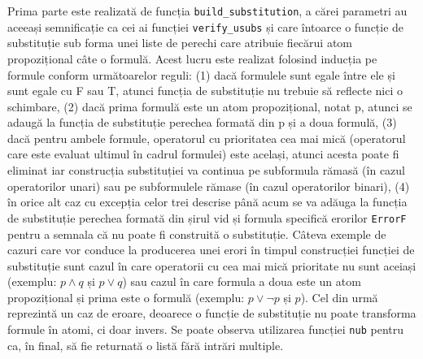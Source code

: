 \documentclass[12pt, openany]{book}
\begin{document}
            \par{}
                Prima parte este realizată de funcția \texttt{build\_substitution}, a cărei parametri au aceeași 
                sem\-nificație ca cei ai funcției \texttt{verify\_usubs} și care întoarce o funcție de substituție sub 
                forma unei liste de perechi care atribuie fiecărui atom propozițional câte o formulă. Acest lucru este 
                realizat folosind inducția pe formule conform următoarelor reguli: (1) dacă formulele sunt egale între 
                ele și sunt egale cu F sau T, atunci funcția de substituție nu trebuie să reflecte nici o schimbare, (2) 
                dacă prima formulă este un atom propozițional, notat p, atunci se adaugă la funcția de substituție 
                perechea formată din p și a doua formulă, (3) dacă pentru ambele formule, operatorul cu prioritatea cea 
                mai mică (operatorul care este evaluat ultimul în cadrul formulei) este același, atunci acesta poate fi 
                eliminat iar construcția substituției va continua pe subformula rămasă (în cazul operatorilor unari) sau 
                pe subformulele rămase (în cazul operatorilor binari), (4) în orice alt caz cu excepția celor trei 
                descrise până acum se va adăuga la funcția de substituție perechea formată din șirul vid și formula 
                specifică erorilor \texttt{ErrorF} pentru a semnala că nu poate fi construită o substituție. Câteva 
                exemple de cazuri care vor conduce la producerea unei erori în timpul construcției funcției de 
                substituție sunt cazul în care operatorii cu cea mai mică prioritate nu sunt aceiași (exemplu: $p \wedge 
                q$ și $p \vee q$) sau cazul în care formula a doua este un atom propozițional și prima este o formulă 
                (exemplu: $p \vee \neg p$ și $p$). Cel din urmă reprezintă un caz de eroare, deoarece o funcție de 
                substituție nu poate transforma formule în atomi, ci doar invers. Se poate observa utilizarea funcției 
                \texttt{nub} pentru ca, în final, să fie returnată o listă fără intrări multiple.
\end{document}
